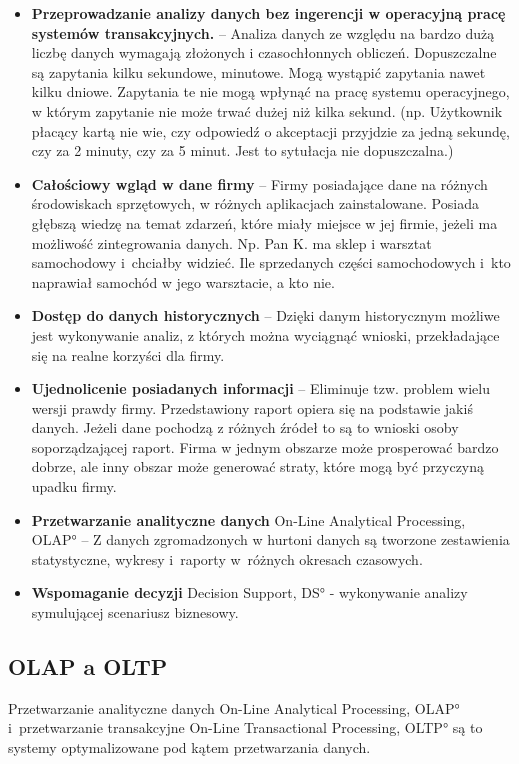 \begin{itemize}
 \item \textbf{Przeprowadzanie analizy danych bez ingerencji w operacyjną pracę systemów transakcyjnych.} --
    Analiza danych ze względu na bardzo dużą liczbę danych wymagają złożonych i czasochłonnych obliczeń.
    Dopuszczalne są zapytania kilku sekundowe, minutowe. Mogą wystąpić zapytania nawet kilku dniowe. 
    Zapytania te nie mogą wpłynąć na pracę systemu operacyjnego, w którym zapytanie nie może trwać dużej niż kilka sekund.
    (np. Użytkownik płacący kartą  nie wie, czy odpowiedź o akceptacji przyjdzie za jedną sekundę, 
    czy za 2 minuty, czy za 5 minut.
     Jest to sytułacja nie dopuszczalna.)
\item \textbf{Całościowy wgląd w dane firmy} --
    Firmy posiadające dane na różnych środowiskach sprzętowych, w różnych aplikacjach zainstalowane.
    Posiada głębszą wiedzę na temat zdarzeń, które miały miejsce w jej firmie, jeżeli ma możliwość zintegrowania danych.
    Np. Pan K. ma sklep i warsztat samochodowy 
     i~chciałby widzieć. Ile sprzedanych części samochodowych i~kto naprawiał samochód w jego warsztacie, a kto nie.
\item \textbf{Dostęp do danych historycznych} -- 
    Dzięki danym historycznym możliwe jest wykonywanie analiz,
     z których można wyciągnąć wnioski, przekładające się na realne korzyści dla firmy.
\item \textbf{Ujednolicenie posiadanych informacji} -- 
  Eliminuje tzw. problem wielu wersji prawdy firmy. 
  Przedstawiony raport opiera się na podstawie jakiś danych. 
  Jeżeli dane pochodzą z różnych źródeł to są to wnioski osoby soporządzającej raport.
  Firma w jednym obszarze może prosperować bardzo dobrze,
   ale inny obszar może generować straty, które mogą być przyczyną upadku firmy.

\item \textbf{Przetwarzanie analityczne danych} \ang{On-Line Analytical Processing, OLAP} --  
  Z danych zgromadzonych w hurtoni danych są tworzone zestawienia statystyczne,
   wykresy i~raporty w~różnych okresach czasowych.
\item \textbf{Wspomaganie decyzji} \ang{Decision Support, DS} - wykonywanie 
  analizy symulującej scenariusz biznesowy. 
  
\end{itemize}


\subsection{OLAP a OLTP}
Przetwarzanie analityczne danych \ang{On-Line Analytical Processing, OLAP} 
 i~przetwarzanie transakcyjne   \ang{On-Line Transactional Processing,  OLTP}
 są to systemy optymalizowane pod kątem przetwarzania danych.

